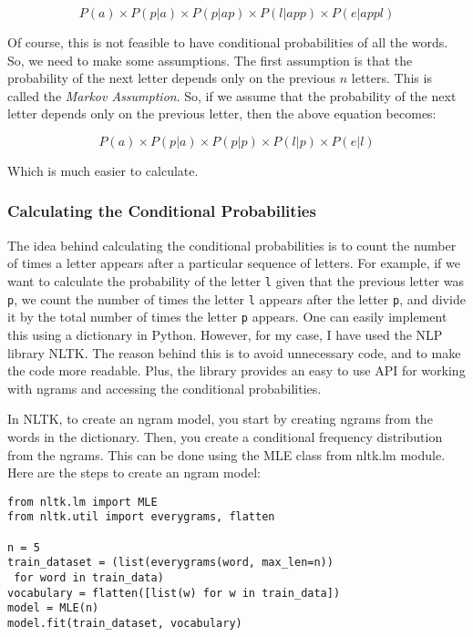 \documentclass[12pt]{article}
\begin{document}
\begin{equation}
    P(a) \times P(p|a) \times P(p|ap) \times P(l|app) \times P(e|appl)
\end{equation}

Of course, this is not feasible to have conditional probabilities of all the words. So, we need to make some assumptions. The first assumption is that the probability of the next letter depends only on the previous $n$ letters. This is called the \textit{Markov Assumption}. So, if we assume that the probability of the next letter depends only on the previous letter, then the above equation becomes:

\begin{equation}
    P(a) \times P(p|a) \times P(p|p) \times P(l|p) \times P(e|l)
\end{equation}

Which is much easier to calculate.

\subsubsection{Calculating the Conditional Probabilities}
The idea behind calculating the conditional probabilities is to count the number of times a letter appears after a particular sequence of letters. For example, if we want to calculate the probability of the letter \verb|l| given that the previous letter was \verb|p|, we count the number of times the letter \verb|l| appears after the letter \verb|p|, and divide it by the total number of times the letter \verb|p| appears. One can easily implement this using a {\color{cyan}dictionary} in Python. However, for my case, I have used the NLP library {\color{cyan}NLTK}. The reason behind this is to avoid unnecessary code, and to make the code more readable. Plus, the library provides an easy to use API for working with ngrams and accessing the conditional probabilities.

In {\color{cyan}NLTK}, to create an ngram model, you start by creating ngrams from the words in the dictionary. Then, you create a conditional frequency distribution from the ngrams. This can be done using the {\color{cyan}MLE} class from {\color{cyan}nltk.lm} module. Here are the steps to create an ngram model:

\begin{verbatim}
from nltk.lm import MLE
from nltk.util import everygrams, flatten

n = 5
train_dataset = (list(everygrams(word, max_len=n))
 for word in train_data)
vocabulary = flatten([list(w) for w in train_data])
model = MLE(n)
model.fit(train_dataset, vocabulary)
\end{verbatim}
\end{document}
